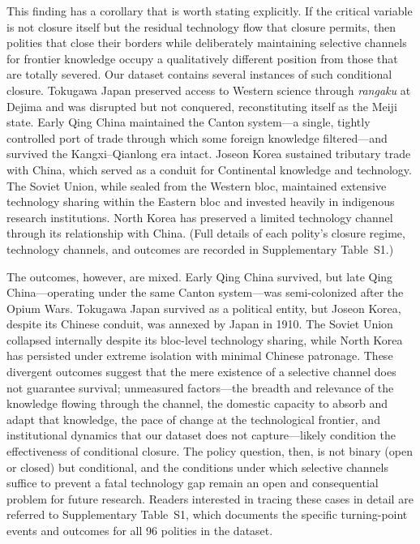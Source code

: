 \documentclass[pdflatex,sn-basic]{sn-jnl}
\theoremstyle{thmstyleone}%
\theoremstyle{thmstyletwo}%
\theoremstyle{thmstylethree}%
\begin{document}
This finding has a corollary that is worth stating explicitly. If the critical variable is not closure itself but the residual technology flow that closure permits, then polities that close their borders while deliberately maintaining selective channels for frontier knowledge occupy a qualitatively different position from those that are totally severed. Our dataset contains several instances of such conditional closure. Tokugawa Japan preserved access to Western science through \emph{rangaku} at Dejima and was disrupted but not conquered, reconstituting itself as the Meiji state. Early Qing China maintained the Canton system---a single, tightly controlled port of trade through which some foreign knowledge filtered---and survived the Kangxi--Qianlong era intact. Joseon Korea sustained tributary trade with China, which served as a conduit for Continental knowledge and technology. The Soviet Union, while sealed from the Western bloc, maintained extensive technology sharing within the Eastern bloc and invested heavily in indigenous research institutions. North Korea has preserved a limited technology channel through its relationship with China. (Full details of each polity's closure regime, technology channels, and outcomes are recorded in Supplementary Table~S1.)

The outcomes, however, are mixed. Early Qing China survived, but late Qing China---operating under the same Canton system---was semi-colonized after the Opium Wars. Tokugawa Japan survived as a political entity, but Joseon Korea, despite its Chinese conduit, was annexed by Japan in 1910. The Soviet Union collapsed internally despite its bloc-level technology sharing, while North Korea has persisted under extreme isolation with minimal Chinese patronage. These divergent outcomes suggest that the mere existence of a selective channel does not guarantee survival; unmeasured factors---the breadth and relevance of the knowledge flowing through the channel, the domestic capacity to absorb and adapt that knowledge, the pace of change at the technological frontier, and institutional dynamics that our dataset does not capture---likely condition the effectiveness of conditional closure. The policy question, then, is not binary (open or closed) but conditional, and the conditions under which selective channels suffice to prevent a fatal technology gap remain an open and consequential problem for future research. Readers interested in tracing these cases in detail are referred to Supplementary Table~S1, which documents the specific turning-point events and outcomes for all 96 polities in the dataset.
\end{document}

